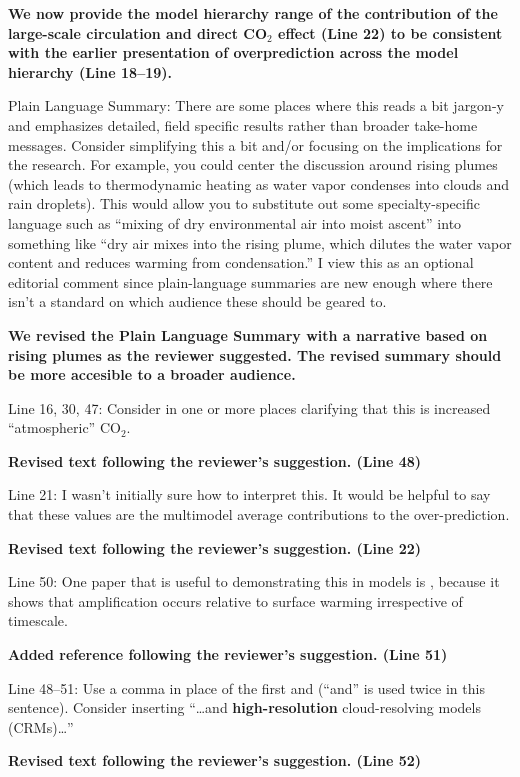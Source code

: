 \documentclass[11pt]{article}
\begin{document}
\textbf{We now provide the model hierarchy range of the contribution of the large-scale circulation and direct CO$_2$ effect (Line 22) to be consistent with the earlier presentation of overprediction across the model hierarchy (Line 18--19).}

Plain Language Summary: There are some places where this reads a bit jargon-y and emphasizes detailed, field specific results rather than broader take-home messages. Consider simplifying this a bit and/or focusing on the implications for the research. For example, you could center the discussion around rising plumes (which leads to thermodynamic heating as water vapor condenses into clouds and rain droplets). This would allow you to substitute out some specialty-specific language such as ``mixing of dry environmental air into moist ascent'' into something like ``dry air mixes into the rising plume, which dilutes the water vapor content and reduces warming from condensation.'' I view this as an optional editorial comment since plain-language summaries are new enough where there isn't a standard on which audience these should be geared to.

\textbf{We revised the Plain Language Summary with a narrative based on rising plumes as the reviewer suggested. The revised summary should be more accesible to a broader audience.}

Line 16, 30, 47: Consider in one or more places clarifying that this is increased ``atmospheric'' CO\(_2\).

\textbf{Revised text following the reviewer's suggestion. (Line 48)}

Line 21: I wasn't initially sure how to interpret this. It would be helpful to say that these values are the multimodel average contributions to the over-prediction.

\textbf{Revised text following the reviewer's suggestion. (Line 22)}

Line 50: One paper that is useful to demonstrating this in models is \cite{santer_amplification_2005}, because it shows that amplification occurs relative to surface warming irrespective of timescale.

\textbf{Added reference following the reviewer's suggestion. (Line 51)}

Line 48--51: Use a comma in place of the first and (``and'' is used twice in this sentence). Consider inserting ``\ldots{}and \textbf{high-resolution} cloud-resolving models (CRMs)\ldots{}''

\textbf{Revised text following the reviewer's suggestion. (Line 52)}
\end{document}
